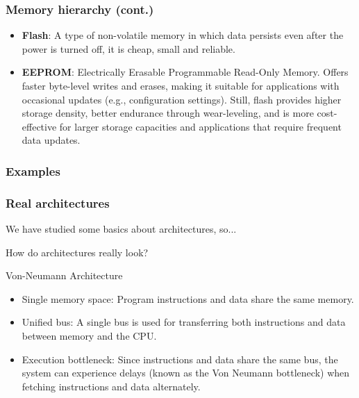 \documentclass[aspectratio=169]{beamer}
\begin{document}
\begin{frame}
  \frametitle{Memory hierarchy (cont.)}
  \begin{itemize}
    \item <1-> \textbf{Flash}: A type of non-volatile memory in which data persists even after the power is turned off, it is cheap, small and reliable.
    \item <2-> \textbf{EEPROM}: Electrically Erasable Programmable Read-Only Memory. Offers faster byte-level writes and erases, making it suitable for applications with occasional updates (e.g., configuration settings). Still, flash provides higher storage density, better endurance through wear-leveling, and is more cost-effective for larger storage capacities and applications that require frequent data updates.
  \end{itemize}
\end{frame}

\subsubsection{Examples}
\begin{frame}
  \frametitle{Real architectures}
  We have studied some basics about architectures, so... \pause
  \begin{block}
    How do architectures really look?
  \end{block}
\end{frame}

\begin{frame}{Von-Neumann Architecture}
  \begin{itemize}
      \item <1-> Single memory space: Program instructions and data share the same memory.
      \item <2-> Unified bus: A single bus is used for transferring both instructions and data between memory and the CPU.
      \item <3-> Execution bottleneck: Since instructions and data share the same bus, the system can experience delays (known as the Von Neumann bottleneck) when fetching instructions and data alternately.
  \end{itemize}
\end{frame}
\end{document}
